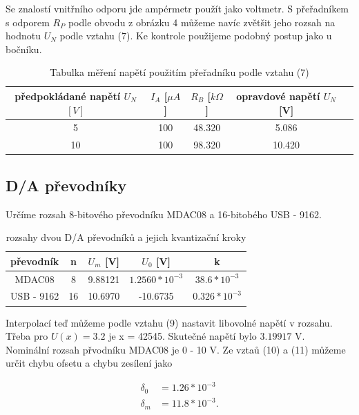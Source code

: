\documentclass[a4paper,11pt]{article}
\begin{document}
Se znalostí vnitřního odporu jde ampérmetr použít jako voltmetr. S přeřadníkem s odporem $R_P$ podle obvodu z obrázku 4 můžeme navíc zvětšit jeho rozsah na hodnotu $U_N$ podle vztahu (7).
Ke kontrole použijeme podobný postup jako u bočníku.


\begin{table}[htpb]
  \centering
  \begin{tabular}{| c | c | c | c | c | }
    \hline
    předpokládané napětí $U_N$ $[V]$ & $I_A$ [$\mu A$] & $R_B$ [$k\Omega$] & opravdové napětí $U_N$ [V] \\\hline
    5 & 100 & 48.320 & 5.086 \\
    10 & 100 & 98.320 & 10.420 \\\hline
  \end{tabular}
  \caption{Tabulka měření napětí použitím přeřadníku podle vztahu (7)}
\end{table}


\subsection{D/A převodníky}

Určíme rozsah 8-bitového převodníku MDAC08 a 16-bitobého USB - 9162.

\begin{table}[htpb]
  \centering
  \begin{tabular}{ | c | c | c | c | c | }
    \hline
    převodník & n & $U_m$ [V] & $U_0$ [V] & k \\\hline
    MDAC08 & 8 & 9.88121 & $1.2560 * 10^{-3}$ & $38.6 * 10 ^ {-3} $  \\
    USB - 9162 & 16 & 10.6970 & -10.6735 & $0.326 * 10 ^ {-3} $ \\\hline
  \end{tabular}
  \caption{rozsahy dvou D/A převodníků a jejich kvantizační kroky}
\end{table}

Interpolací teď můžeme podle vztahu (9) nastavit libovolné napětí v rozsahu. Třeba pro $U(x) = 3.2$ je x = 42545. 
Skutečné napětí bylo $3.19917$ V. \\

Nominální rozsah přvodníku MDAC08 je 0 - 10 V. Ze vztaů (10) a (11) můžeme určit chybu ofsetu a chybu zesílení jako

\begin{align}
  \delta_0 &= 1.26 * 10^{-3}\\
  \delta_m &= 11.8 * 10^{-3}.
\end{align}
\end{document}

